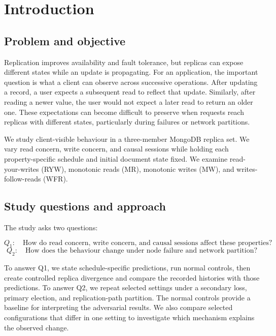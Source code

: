 \section{Introduction}

\subsection{Problem and objective}

Replication improves availability and fault tolerance, but replicas can expose
different states while an update is propagating. For an application, the
important question is what a client can observe across successive operations. After updating a record, a user expects a subsequent read to reflect that update. Similarly, after reading a newer value, the user would not expect a later read to return an older one. These expectations can become difficult to preserve when requests reach replicas with different states, particularly during failures or network partitions.

We study client-visible behaviour in a three-member MongoDB replica set. We
vary read concern, write concern, and causal sessions while holding each
property-specific schedule and initial document state fixed. We examine read-your-writes (RYW), monotonic reads (MR), monotonic
writes (MW), and writes-follow-reads (WFR).

\subsection{Study questions and approach}

The study asks two questions:

\[
Q_1:\quad
\text{How do read concern, write concern, and causal sessions affect these properties?}
\]
\[
Q_2:\quad
\text{How does the behaviour change under node failure and network partition?}
\]

To answer Q1, we state schedule-specific predictions, run normal controls,
then create controlled replica divergence and compare the recorded histories
with those predictions. To answer Q2, we repeat selected settings under a
secondary loss, primary election, and replication-path partition. The normal
controls provide a baseline for interpreting the adversarial results. We also compare selected configurations that differ in one setting to investigate which mechanism explains the observed change.
